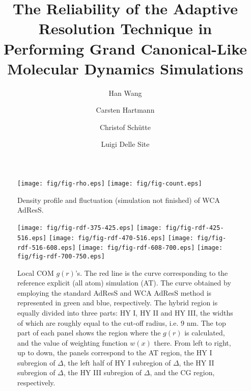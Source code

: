 \documentclass[aip,jcp,a4paper,reprint,onecolumn]{revtex4-1}
\begin{document}
\title{The Reliability of the Adaptive Resolution Technique in Performing  Grand Canonical-Like Molecular Dynamics Simulations}
\author{Han Wang}
\author{Carsten Hartmann}
\author{Christof Sch\"utte}
\author{Luigi Delle Site}

\begin{abstract}
\end{abstract}

\maketitle


\begin{figure}
  \centering
  \texttt{[image: fig/fig-rho.eps]}
  \texttt{[image: fig/fig-count.eps]}
  \caption{Density profile and fluctuation (simulation not finished) of WCA AdResS.}
  \label{fig:den}
\end{figure}

\begin{figure}
  \centering
  \texttt{[image: fig/fig-rdf-375-425.eps]}
  \texttt{[image: fig/fig-rdf-425-516.eps]}
  \texttt{[image: fig/fig-rdf-470-516.eps]}
  \texttt{[image: fig/fig-rdf-516-608.eps]}
  \texttt{[image: fig/fig-rdf-608-700.eps]}
  \texttt{[image: fig/fig-rdf-700-750.eps]}
  \caption{Local COM $g(r)$'s.
    The red line is the curve corresponding to the reference explicit (all atom)
    simulation (AT).
    The curve obtained by employing the standard AdResS and WCA AdResS
    method is represented in green and blue, respectively.
    The hybrid region is equally
    divided into three parts: HY I, HY II and HY III, the widths of
    which are roughly equal to the cut-off radius, i.e. 9 \textsf{nm}.    
    The top part of each panel shows the region where the $g(r)$ is calculated,
    and the value of weighting function $w(x)$ there.
    From left to right, up to down, the panels correspond to the AT region, 
    the HY I subregion of $\Delta$,
    the left half of HY I subregion of $\Delta$,
    the HY II subregion of $\Delta$,
    the HY III subregion of $\Delta$,
    and the CG region, respectively.
  }
  \label{fig:tmp1a}
\end{figure}
\end{document}
